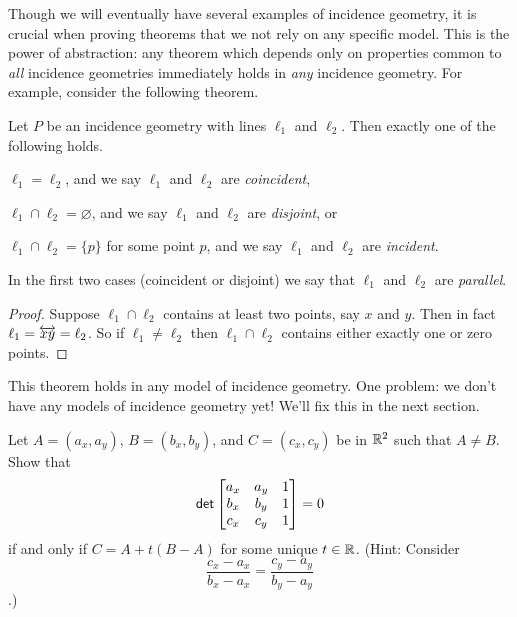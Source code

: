 Though we will eventually have several examples of incidence geometry, it is crucial when proving theorems that we not rely on any specific model.
This is the power of abstraction: any theorem which depends only on properties common to \emph{all} incidence geometries immediately holds in \emph{any} incidence geometry.
For example, consider the following theorem.

\begin{prop}
Let \(P\) be an incidence geometry with lines \(\ell_1\) and \(\ell_2\).
Then exactly one of the following holds.
\begin{proplist}
\item \(\ell_1 = \ell_2\), and we say \(\ell_1\) and \(\ell_2\) are \emph{coincident},
\item \(\ell_1 \cap \ell_2 = \varnothing\), and we say \(\ell_1\) and \(\ell_2\) are \emph{disjoint}, or
\item \(\ell_1 \cap \ell_2 = \{p\}\) for some point \(p\), and we say \(\ell_1\) and \(\ell_2\) are \emph{incident}.
\end{proplist}
In the first two cases (coincident or disjoint) we say that \(\ell_1\) and \(\ell_2\) are \emph{parallel}.
\end{prop}

\begin{proof}
Suppose \(\ell_1 \cap \ell_2\) contains at least two points, say \(x\) and \(y\).
Then in fact \(\ell_1 = \overleftrightarrow{xy} = \ell_2\).
So if \(\ell_1 \neq \ell_2\) then \(\ell_1 \cap \ell_2\) contains either exactly one or zero points.
\end{proof}

This theorem holds in any model of incidence geometry.
One problem: we don't have any models of incidence geometry yet!
We'll fix this in the next section.



\Exercises%

\begin{exercise}\label{exerc:rr2-collinear-comb}
Let \(A = (a_x, a_y)\), \(B = (b_x, b_y)\), and \(C = (c_x, c_y)\) be in \(\mathbb{R}^2\) such that \(A \neq B\).
Show that \[ \mathsf{det} \begin{bmatrix} a_x & a_y & 1 \\ b_x & b_y & 1 \\ c_x & c_y & 1 \end{bmatrix} = 0 \] if and only if \(C = A + t(B - A)\) for some unique \(t \in \mathbb{R}\).
(Hint: Consider \[ \frac{c_x - a_x}{b_x - a_x} = \frac{c_y - a_y}{b_y - a_y} \].)
\end{exercise}

